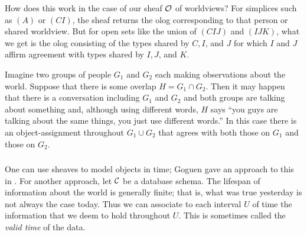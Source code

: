 \documentclass[CT4S-EN-RU]{subfiles}
\begin{document}
\begin{blockRUS}
\end{blockRUS}

\begin{blockENG}
How does this work in the case of our sheaf $\mathcal{O}$ of worldviews? For simplices such as $(A)$ or $(CI)$, the sheaf returns the olog corresponding to that person or shared worldview. But for open sets like the union of $(CIJ)$ and $(IJK)$, what we get is the olog consisting of the types shared by $C, I$, and $J$ for which $I$ and $J$ affirm agreement with types shared by $I, J$, and $K$.
\end{blockENG}

\begin{blockRUS}
\end{blockRUS}

\begin{exampleENG}
Imagine two groups of people $G_1$ and $G_2$ each making observations about the world. Suppose that there is some overlap $H=G_1\cap G_2$. Then it may happen that there is a conversation including $G_1$ and $G_2$ and both groups are talking about something and, although using different words, $H$ says “you guys are talking about the same things, you just use different words.” In this case there is an object-assignment throughout $G_1\cup G_2$ that agrees with both those on $G_1$ and those on $G_2$.
\end{exampleENG}

\begin{exampleRUS}
\end{exampleRUS}


\subsubsection{}

\begin{blockENG}
One can use sheaves to model objects in time; Goguen gave an approach to this in \cite{Gog}. For another approach, let $\mathcal{C}$ be a database schema. The lifespan of information about the world is generally finite; that is, what was true yesterday is not always the case today. Thus we can associate to each interval $U$ of time the information that we deem to hold throughout $U$. This is sometimes called the {\em valid time} of the data.
\end{blockENG}
\end{document}

